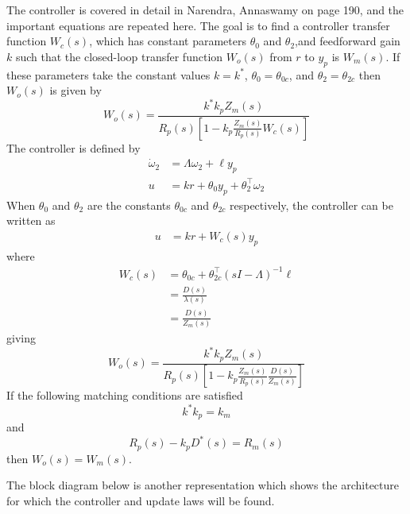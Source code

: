 The controller is covered in detail in Narendra, Annaswamy on page 190, and the important equations are repeated here.
The goal is to find a controller transfer function $W_{c}(s)$, which has constant parameters $\theta_{0}$ and $\theta_{2}$,and feedforward gain $k$ such that the closed-loop transfer function $W_{o}(s)$ from $r$ to $y_{p}$ is $W_{m}(s)$.
If these parameters take the constant values $k=k^{*}$, $\theta_{0}=\theta_{0c}$, and $\theta_{2}=\theta_{2c}$ then $W_{o}(s)$ is given by
\begin{equation*}
  W_{o}(s)=\frac{k^{*}k_{p}Z_{m}(s)}{R_{p}(s)\left[1-k_{p}\frac{Z_{m}(s)}{R_{p}(s)}W_{c}(s)\right]}
\end{equation*}
The controller is defined by
\begin{align*}
  \dot{\omega}_{2}&=\Lambda\omega_{2}+\ell y_{p} \\
  u&=kr+\theta_{0}y_{p}+\theta_{2}^{\top}\omega_{2}
\end{align*}
When $\theta_{0}$ and $\theta_{2}$ are the constants $\theta_{0c}$ and $\theta_{2c}$ respectively, the controller can be written as
\begin{align*}
  u&=kr+W_{c}(s)y_{p}
\end{align*}
where
\begin{align*}
  W_{c}(s)&=\theta_{0c}+\theta_{2c}^{\top}(sI-\Lambda)^{-1}\ell \\
  &=\frac{D(s)}{\lambda(s)} \\
  &=\frac{D(s)}{Z_{m}(s)}
\end{align*}
giving
\begin{equation*}
  W_{o}(s)=\frac{k^{*}k_{p}Z_{m}(s)}{R_{p}(s)\left[1-k_{p}\frac{Z_{m}(s)}{R_{p}(s)}\frac{D(s)}{Z_{m}(s)}\right]}
\end{equation*}
If the following matching conditions are satisfied
\begin{equation*}
  k^{*}k_{p}=k_{m}
\end{equation*}
and
\begin{equation*}
  R_{p}(s)-k_{p}D^{*}(s)=R_{m}(s)
\end{equation*}
then $W_{o}(s)=W_{m}(s)$.

The block diagram below is another representation which shows the architecture for which the controller and update laws will be found.

